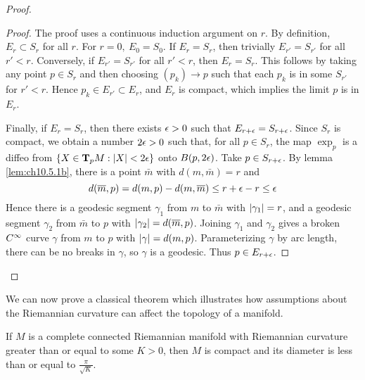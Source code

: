 \documentclass[../main]{subfiles}
\begin{document}
\begin{proof}
\begin{proof}
The proof uses a continuous induction argument on $r$. By definition, $E_r\subset S_r$ for all $r$. For $r=0,~E_0=S_0$. If $E_r=S_r$, then trivially $E_{r'}=S_{r'}$ for all $r'<r$. Conversely, if $E_{r'}=S_{r'}$ for all $r'<r$, then $E_r=S_r$. This follows by taking any point $p\in S_r$ and then choosing $(p_k)\to p$ such that each $p_k$ is in some $S_{r'}$ for $r'<r$. Hence $p_k\in E_{r'}\subset E_r$, and $E_r$ is compact, which implies the limit $p$ is in $E_r$.

Finally, if $E_r=S_r$, then there exists $\ep>0$ such that $E_{r+\ep}=S_{r+\ep}$. Since $S_r$ is compact, we obtain a number $2\ep>0$ such that, for all $p\in S_r$, the map $\exp_p$ is a diffeo from $\brc{X\in\ts Mp: \norm X<2\ep}$ onto $B(p,2\ep)$. Take $p\in S_{r+\ep}$. By lemma \ref{lem:ch10.5.1b}, there is a point $\bar m$ with $d(m,\bar m)=r$ and 
\[d(\bar m,p) = d(m,p) - d(m,\bar m)
\le r+\ep-r \le \ep\]
Hence there is a geodesic segment $\gamma_1$ from $m$ to $\bar m$ with $\norm{\gamma_1}=r$, and a geodesic segment $\gamma_2$ from $\bar m$ to $p$ with $\norm{\gamma_2}=d(\bar m,p)$. Joining $\gamma_1$ and $\gamma_2$ gives a broken $\CInfty$ curve $\gamma$ from $m$ to $p$ with $\norm\gamma=d(m,p)$. Parameterizing $\gamma$ by arc length, there can be no breaks in $\gamma$, so $\gamma$ is a geodesic. Thus $p\in E_{r+\ep}$.
\end{proof}

\end{proof}



We can now prove a classical theorem which illustrates how assumptions about the Riemannian curvature can affect the topology of a manifold.



\begin{theorem}[of Bonnet] \label{thm:ch10.5.2}
If $M$ is a complete connected Riemannian manifold with Riemannian curvature greater than or equal to some $K>0$, then $M$ is compact and its diameter is less than or equal to $\frac\pi{\sqrt K}$.
\end{theorem}
\end{document}
